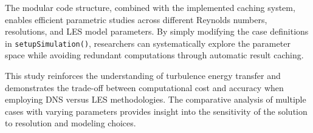 The modular code structure, combined with the implemented caching system, enables efficient parametric studies across different Reynolds numbers, resolutions, and LES model parameters. By simply modifying the case definitions in \texttt{setupSimulation()}, researchers can systematically explore the parameter space while avoiding redundant computations through automatic result caching.

This study reinforces the understanding of turbulence energy transfer and demonstrates the trade-off between computational cost and accuracy when employing DNS versus LES methodologies. The comparative analysis of multiple cases with varying parameters provides insight into the sensitivity of the solution to resolution and modeling choices.